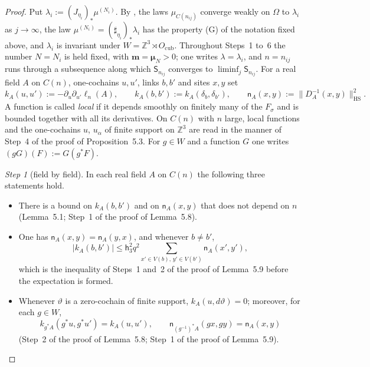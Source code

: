 \documentclass[11pt,letterpaper,reqno]{amsart}
\theoremstyle{definition}
\begin{document}
\begin{proof}
Put $\lambda_i:=(J_{\eta_i})_*\mu^{(N_i)}$.
By \cite[Proposition~12.15\,(a)--(c)]{QEDII}, the laws $\mu_{C(n_{ij})}$ converge weakly on $\Omega$ to $\lambda_i$ as $j\to\infty$,
the law $\mu^{(N_i)}=(\sharp_{\eta_i})_*\lambda_i$ has the property (G) of the notation fixed above,
and $\lambda_i$ is invariant under $W=\mathbb Z^3\rtimes O_{\mathrm{cub}}$.
Throughout Steps~1 to~6 the number $N=N_i$ is held fixed, with $\mathbf m=\boldsymbol\mu_N>0$;
one writes $\lambda=\lambda_i$, and $n=n_{ij}$ runs through a subsequence along which $\mathsf S_{n_{ij}}$ converges to $\liminf_j\mathsf S_{n_{ij}}$.
For a real field $A$ on $C(n)$, one-cochains $u,u'$, links $b,b'$ and sites $x,y$ set
\begin{equation*}
k_A(u,u'):=-\partial_u\partial_{u'}\ell_n(A),\qquad k_A(b,b'):=k_A(\delta_b,\delta_{b'}),\qquad\mathsf n_A(x,y):=\|D_A^{-1}(x,y)\|^2_{\mathrm{HS}}.
\end{equation*}
A function is called \emph{local} if it depends smoothly on finitely many of the $F_\sigma$ and is bounded together with all its derivatives.
On $C(n)$ with $n$ large, local functions and the one-cochains $u$, $u_\alpha$ of finite support on $\mathbb Z^3$ are read in the manner of Step~4 of the proof of Proposition~5.3.
For $g\in W$ and a function $G$ one writes $(gG)(F):=G(g^*F)$.

\emph{Step 1} (field by field).
In each real field $A$ on $C(n)$ the following three statements hold.
\begin{itemize}
\item[(i)] There is a bound on $k_A(b,b')$ and on $\mathsf n_A(x,y)$ that does not depend on $n$ (Lemma~5.1; Step~1 of the proof of Lemma~5.8).
\item[(ii)] One has $\mathsf n_A(x,y)=\mathsf n_A(y,x)$, and whenever $b\ne b'$,
\begin{equation*}
|k_A(b,b')|\le\mathsf h_3^2q^2\sum_{x'\in V(b),\,y'\in V(b')}\mathsf n_A(x',y'),
\end{equation*}
which is the inequality of Steps~1 and~2 of the proof of Lemma~5.9 before the expectation is formed.
\item[(iii)] Whenever $\vartheta$ is a zero-cochain of finite support, $k_A(u,d\vartheta)=0$;
moreover, for each $g\in W$,
\begin{equation*}
k_{g^*A}(g^*u,g^*u')=k_A(u,u'),\qquad\mathsf n_{(g^{-1})^*A}(gx,gy)=\mathsf n_A(x,y)
\end{equation*}
(Step~2 of the proof of Lemma~5.8; Step~1 of the proof of Lemma~5.9).
\end{itemize}


\end{proof}
\end{document}
